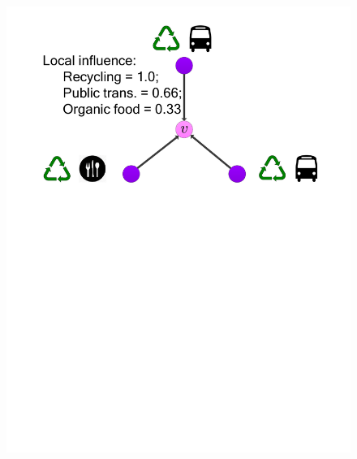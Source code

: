 \documentclass{article}
\begin{document}
\begin{figure}[htb]
{\includegraphics[viewport=1.75in 4in 7in 11in, width=\linewidth]{figs/timeline-2a}}%
\hspace{.2\linewidth}%
\parbox[][][t]{.3\linewidth}{%
}
\parbox{.3\linewidth}{
}
\end{figure}
\end{document}

